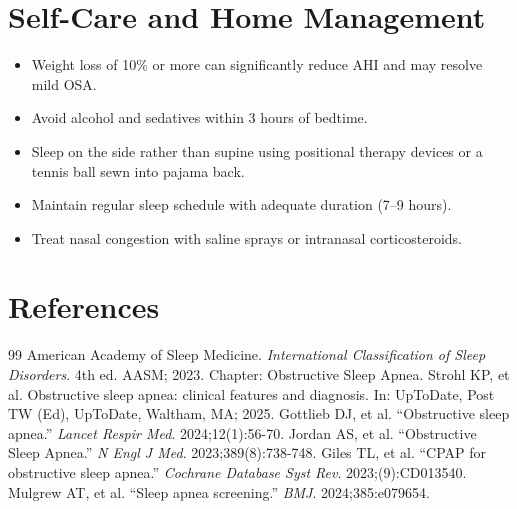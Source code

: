 \section*{Self-Care and Home Management}
\begin{itemize}
  \item Weight loss of 10\% or more can significantly reduce AHI and may resolve mild OSA.
  \item Avoid alcohol and sedatives within 3 hours of bedtime.
  \item Sleep on the side rather than supine using positional therapy devices or a tennis ball sewn into pajama back.
  \item Maintain regular sleep schedule with adequate duration (7--9 hours).
  \item Treat nasal congestion with saline sprays or intranasal corticosteroids.
\end{itemize}

\section*{References}
\begin{thebibliography}{99}
 American Academy of Sleep Medicine. \emph{International Classification of Sleep Disorders}. 4th ed. AASM; 2023. Chapter: Obstructive Sleep Apnea.
 Strohl KP, et al. Obstructive sleep apnea: clinical features and diagnosis. In: UpToDate, Post TW (Ed), UpToDate, Waltham, MA; 2025.
 Gottlieb DJ, et al. ``Obstructive sleep apnea.'' \emph{Lancet Respir Med}. 2024;12(1):56-70.
 Jordan AS, et al. ``Obstructive Sleep Apnea.'' \emph{N Engl J Med}. 2023;389(8):738-748.
 Giles TL, et al. ``CPAP for obstructive sleep apnea.'' \emph{Cochrane Database Syst Rev}. 2023;(9):CD013540.
 Mulgrew AT, et al. ``Sleep apnea screening.'' \emph{BMJ}. 2024;385:e079654.
\end{thebibliography}
